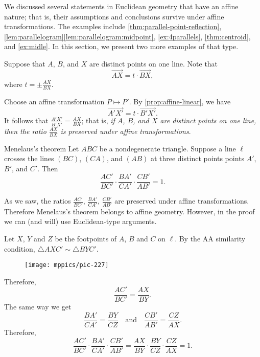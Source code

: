 We discussed several statements in Euclidean geometry that have an affine nature;
that is, their assumptions and conclusions survive under affine transformations.
The examples include 
\ref{thm:parallel-point-reflection},
\ref{lem:parallelogram}\ref{lem:parallelogram:midpoint},
\ref{ex:4parallels},
\ref{thm:centroid},
and \ref{ex:midle}.
In this section, we present two more examples of that type.

Suppose that $A$, $B$, and $X$ are distinct points on one line.
Note that 
\[\overrightarrow{AX}=t\cdot \overrightarrow{BX},\]
where $t=\pm\frac{AX}{BX}$.

Choose an affine transformation $P\mapsto P'$.
By \ref{prop:affine-linear}, we have 
\[\overrightarrow{A'X'}=t\cdot \overrightarrow{B'X'}.\]
It follows that $\frac{A'X'}{B'X'}=\frac{AX}{BX}$;
that is, \textit{if $A$, $B$, and $X$ are distinct points on one line, then the ratio $\frac{AX}{BX}$ is preserved under affine transformations}.

\begin{thm}{Menelaus's theorem}
Let $ABC$ be a nondegenerate triangle.
Suppose a line $\ell$ crosses the lines $(BC)$, $(CA)$, and $(AB)$ at three distinct points points $A'$, $B'$, and $C'$.
Then 
\[\frac{AC'}{BC'}\cdot\frac{BA'}{CA'}\cdot \frac{CB'}{AB'}=1.\]
\end{thm}

As we saw, the ratios $\frac{AC'}{BC'}$, $\frac{BA'}{CA'}$, $\frac{CB'}{AB'}$ are preserved under affine transformations.
Therefore Menelaus's theorem belongs to affine geometry.
However, in the proof we can (and will) use Euclidean-type arguments.

Let $X$, $Y$ and $Z$ be the footpoints of $A$, $B$ and $C$ on $\ell$.
By the AA similarity condition, $\triangle AXC'\sim \triangle BYC'$.
\begin{figure}[!ht]
\centering
\texttt{[image: mppics/pic-227]}
\end{figure}
Therefore, 
\[\frac{AC'}{BC'}=\frac{AX}{BY}.\]
The same way we get
\[\frac{BA'}{CA'}=\frac{BY}{CZ}
\quad\text{and}\quad
\frac{CB'}{AB'}=\frac{CZ}{AX}.\]
Therefore,
\[\frac{AC'}{BC'}\cdot\frac{BA'}{CA'}\cdot \frac{CB'}{AB'}=\frac{AX}{BY}\cdot \frac{BY}{CZ}\cdot \frac{CZ}{AX}=1.\]
\qedsf



